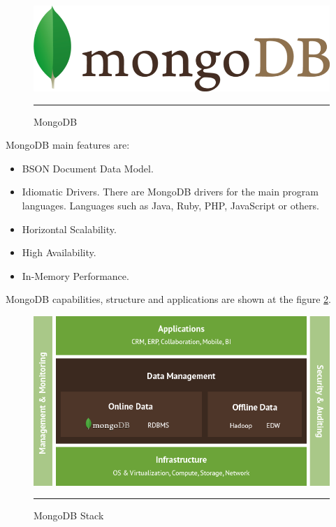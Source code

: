 \documentclass[12pt, a4paper,twoside]{tesi_upf}
\begin{document}
        \begin{figure}[H]
          \centering
              \includegraphics[scale=0.2]{./figures/mdblogo.png}
              \rule{32em}{0.5pt}
          \caption[MongoDB Logo]{MongoDB}
          \label{fig:MongoDB}
        \end{figure}
        
        
        MongoDB main features are:
        \begin{itemize}
        \item BSON Document Data Model.
        \item Idiomatic Drivers. There are MongoDB drivers for the main program languages. Languages such as Java, Ruby, PHP, JavaScript or others.
        \item Horizontal Scalability.
        \item High Availability.
        \item In-Memory Performance.
        \end{itemize}
        
        MongoDB capabilities, structure and applications are shown at the figure \ref{fig:MongoDB Stack}. 
        
        \begin{figure}[H]
          \centering
              \includegraphics[scale=0.5]{./figures/mfeatures.png}
              \rule{32em}{0.5pt}
          \caption[MongoDB Stack]{MongoDB Stack}
          \label{fig:MongoDB Stack}
        \end{figure}
        
\end{document}
